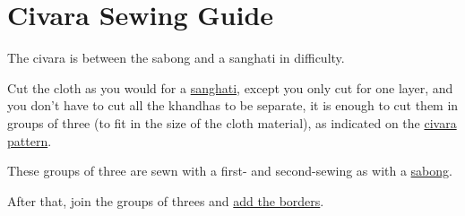 \chapter{Civara Sewing Guide}

The civara is between the sabong and a sanghati in difficulty.

Cut the cloth as you would for a \href{/en/sanghati-guide}{sanghati},
except you only cut for one layer, and you don't have to cut all the
khandhas to be separate, it is enough to cut them in groups of three (to
fit in the size of the cloth material), as indicated on the
\href{/en/civara-pattern}{civara pattern}.

These groups of three are sewn with a first- and second-sewing as with a
\href{/en/sabong-guide}{sabong}.

After that, join the groups of threes and \href{/en/borders}{add the
borders}.

